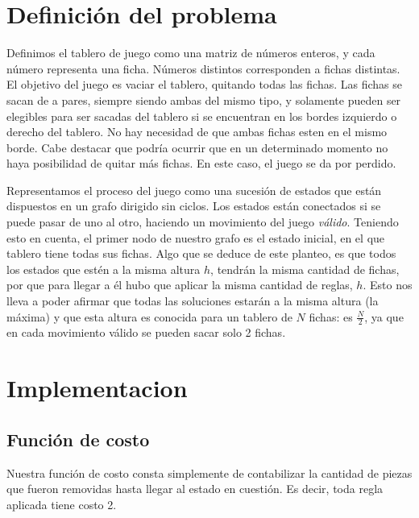 \documentclass[a4paper,10pt]{article}
\begin{document}
\setcounter{page}{1}


\section{Definición del problema}


Definimos el tablero de juego como una matriz de números enteros, y cada número representa una ficha. Números distintos corresponden a fichas distintas. 
El objetivo del juego es vaciar el tablero, quitando todas las fichas. Las fichas se sacan de a pares, siempre siendo ambas del mismo tipo, y solamente pueden ser elegibles 
para ser sacadas del tablero si se encuentran en los bordes izquierdo o derecho del tablero. No hay necesidad de que ambas fichas esten en el mismo borde. Cabe destacar 
que podría ocurrir que en un determinado momento no haya posibilidad de quitar más fichas. En este caso, el juego se da por perdido.

\label{problem-info}
Representamos el proceso del juego como una sucesión de estados que están dispuestos en un grafo dirigido sin ciclos. Los estados están conectados si se puede pasar de uno 
al otro, haciendo un movimiento del juego \textit{válido}. Teniendo esto en cuenta, el primer nodo de nuestro grafo es el estado inicial, en el que tablero tiene todas sus fichas. Algo que 
se deduce de este planteo, es que todos los estados que estén a la misma altura $h$, tendrán la misma cantidad de fichas, por que para llegar a él hubo que aplicar la misma cantidad de reglas, $h$.
Esto nos lleva a poder afirmar que todas las soluciones estarán a la misma altura (la máxima) y que esta altura es conocida para un tablero de $N$ fichas: es 
$\frac{N}{2}$, ya que en cada movimiento válido se pueden sacar solo 2 fichas.

\section{Implementacion}


    \subsection{Función de costo}

    Nuestra función de costo consta simplemente de contabilizar la cantidad de piezas que fueron removidas hasta llegar al estado en cuestión. Es decir, toda regla aplicada tiene costo 2. \\
\end{document}
